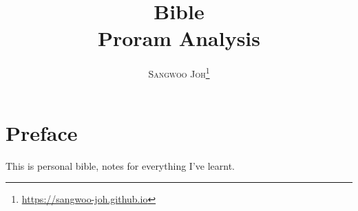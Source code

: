 \documentclass[12pt, a4paper, oneside]{book}
\title{
  \Huge \textbf{Bible}
  \\
  \huge {Proram Analysis}
}
\author{\textsc{Sangwoo Joh}\footnote{\url{https://sangwoo-joh.github.io}}}
\begin{document}
\frontmatter
\maketitle

\tableofcontents  %
\listoffigures  %
\listoftables   %

\mainmatter


\chapter*{Preface}
This is personal bible, notes for everything I've learnt.











\end{document}
